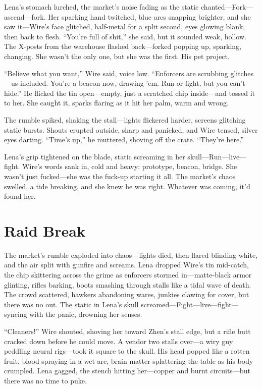 \documentclass[12pt]{book}
\begin{document}
Lena's stomach lurched, the market's noise fading as the static chanted---Fork---ascend---fork. Her sparking hand twitched, blue arcs snapping brighter, and she saw it---Wire's face glitched, half-metal for a split second, eyes glowing blank, then back to flesh. ``You're full of shit,'' she said, but it sounded weak, hollow. The X-posts from the warehouse flashed back---forked popping up, sparking, changing. She wasn't the only one, but she was the first. His pet project.

``Believe what you want,'' Wire said, voice low. ``Enforcers are scrubbing glitches---us included. You're a beacon now, drawing 'em. Run or fight, but you can't hide.'' He flicked the tin open---empty, just a scratched chip inside---and tossed it to her. She caught it, sparks flaring as it hit her palm, warm and wrong.

The rumble spiked, shaking the stall---lights flickered harder, screens glitching static bursts. Shouts erupted outside, sharp and panicked, and Wire tensed, silver eyes darting. ``Time's up,'' he muttered, shoving off the crate. ``They're here.''

Lena's grip tightened on the blade, static screaming in her skull---Run---live---fight. Wire's words sank in, cold and heavy: prototype, beacon, bridge. She wasn't just fucked---she was the fuck-up starting it all. The market's chaos swelled, a tide breaking, and she knew he was right. Whatever was coming, it'd found her.

\section{Raid Break}

The market’s rumble exploded into chaos---lights died, then flared blinding white, and the air split with gunfire and screams. Lena dropped Wire’s tin mid-catch, the chip skittering across the grime as enforcers stormed in---matte-black armor glinting, rifles barking, boots smashing through stalls like a tidal wave of death. The crowd scattered, hawkers abandoning wares, junkies clawing for cover, but there was no out. The static in Lena’s skull screamed---Fight---live---fight---syncing with the panic, drowning her senses.

``Cleaners!'' Wire shouted, shoving her toward Zhen’s stall edge, but a rifle butt cracked down before he could move. A vendor two stalls over---a wiry guy peddling neural rigs---took it square to the skull. His head popped like a rotten fruit, blood spraying in a wet arc, brain matter splattering the table as his body crumpled. Lena gagged, the stench hitting her---copper and burnt circuits---but there was no time to puke.
\end{document}
